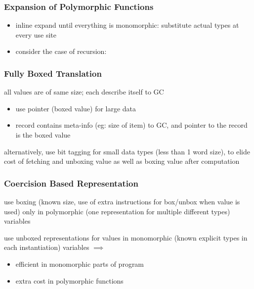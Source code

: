 \documentclass[8pt]{extarticle}
\begin{document}
\begin{multicols*}{2}
  \subsubsection{Expansion of Polymorphic Functions}
  \begin{itemize}
  \item inline expand until everything is monomorphic: substitute actual types at every use site
  \item consider the case of recursion:
  \end{itemize}

  \subsubsection{Fully Boxed Translation}
  all values are of same size; each describe itself to GC

  \begin{itemize}
  \item use pointer (boxed value) for large data
  \item record contains meta-info (eg: size of item) to GC, and pointer to the record is the boxed value
  \end{itemize}

  alternatively, use bit tagging for small data types (less than 1 word size), to elide cost of fetching and unboxing value as well as boxing value after computation

  \subsubsection{Coercision Based Representation}

  use boxing (known size, use of extra instructions for box/unbox when value is used) only in polymorphic (one representation for multiple different types) variables

  use unboxed representations for values in monomorphic (known explicit types in each instantiation) variables $\implies$
  \begin{itemize}
  \item efficient in monomorphic parts of program
  \item extra cost in polymorphic functions
  \end{itemize}


\end{multicols*}
\end{document}
